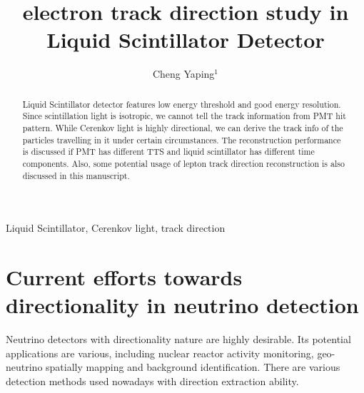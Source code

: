 \documentclass[a4paper,10pt]{cpc-hepnp}
\begin{document}
\title{electron track direction study in Liquid Scintillator Detector}

\author{%
      Cheng Yaping$^{1}$%
}
\maketitle
\address{%
$^1$ Institute of High Energy Physics, Chinese
        Academy of Sciences, Beijing 100049, China\\
}


\begin{abstract}
Liquid Scintillator detector features low energy threshold
and good energy resolution. Since scintillation light is isotropic,
we cannot tell the track information from PMT hit pattern.
While Cerenkov light is highly directional, we can derive the track
info of the particles travelling in it under certain circumstances.
The reconstruction performance is discussed if PMT has different TTS and
liquid scintillator has different time components. Also, some potential
usage of lepton track direction reconstruction is also discussed in this manuscript.
\end{abstract}


\begin{keyword}
Liquid Scintillator, Cerenkov light, track direction
\end{keyword}




\section{Current efforts towards directionality in neutrino detection}
Neutrino detectors with directionality nature are highly desirable.
Its potential applications are various, including nuclear reactor activity monitoring,
geo-neutrino spatially mapping and background identification.
There are various detection methods used nowadays with direction extraction
ability.
\end{document}
